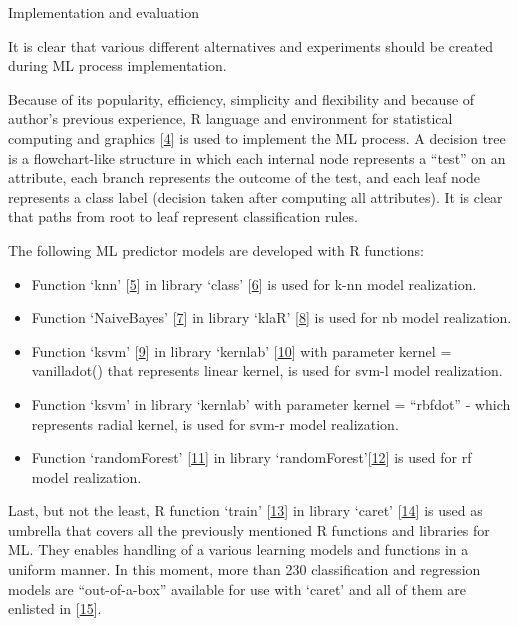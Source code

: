 \documentclass[
  ignorenonframetext,
]{beamer}
\begin{document}
\begin{frame}[fragile]{Implementation and evaluation}
\protect\hypertarget{implementation-and-evaluation}{}

It is clear that various different alternatives and experiments should
be created during ML process implementation.

Because of its popularity, efficiency, simplicity and flexibility and
because of author's previous experience, R language and environment for
statistical computing and graphics
{[}\protect\hyperlink{ref-rfoundations}{4}{]} is used to implement the
ML process. A decision tree is a flowchart-like structure in which each
internal node represents a ``test'' on an attribute, each branch
represents the outcome of the test, and each leaf node represents a
class label (decision taken after computing all attributes). It is clear
that paths from root to leaf represent classification rules.

The following ML predictor models are developed with R functions:

\begin{itemize}
\item
  Function `knn' {[}\protect\hyperlink{ref-rfunknn}{5}{]} in library
  `class' {[}\protect\hyperlink{ref-rbibclass}{6}{]} is used for k-nn
  model realization.
\item
  Function `NaiveBayes' {[}\protect\hyperlink{ref-rfunnaivebayes}{7}{]}
  in library `klaR' {[}\protect\hyperlink{ref-rbibklar}{8}{]} is used
  for nb model realization.
\item
  Function `ksvm' {[}\protect\hyperlink{ref-rfunkvsm}{9}{]} in library
  `kernlab' {[}\protect\hyperlink{ref-rbibkernlab}{10}{]} with parameter
  kernel = vanilladot() that represents linear kernel, is used for svm-l
  model realization.
\item
  Function `ksvm' in library `kernlab' with parameter kernel =
  ``rbfdot'' - which represents radial kernel, is used for svm-r model
  realization.
\item
  Function `randomForest'
  {[}\protect\hyperlink{ref-rfunrandomforest}{11}{]} in library
  `randomForest'{[}\protect\hyperlink{ref-rbibrandomforest}{12}{]} is
  used for rf model realization.
\end{itemize}

Last, but not the least, R function `train'
{[}\protect\hyperlink{ref-rfuntrain}{13}{]} in library `caret'
{[}\protect\hyperlink{ref-rbibcaret}{14}{]} is used as umbrella that
covers all the previously mentioned R functions and libraries for ML.
They enables handling of a various learning models and functions in a
uniform manner. In this moment, more than 230 classification and
regression models are ``out-of-a-box'' available for use with `caret'
and all of them are enlisted in
{[}\protect\hyperlink{ref-kuhnam}{15}{]}.


\end{frame}
\end{document}
